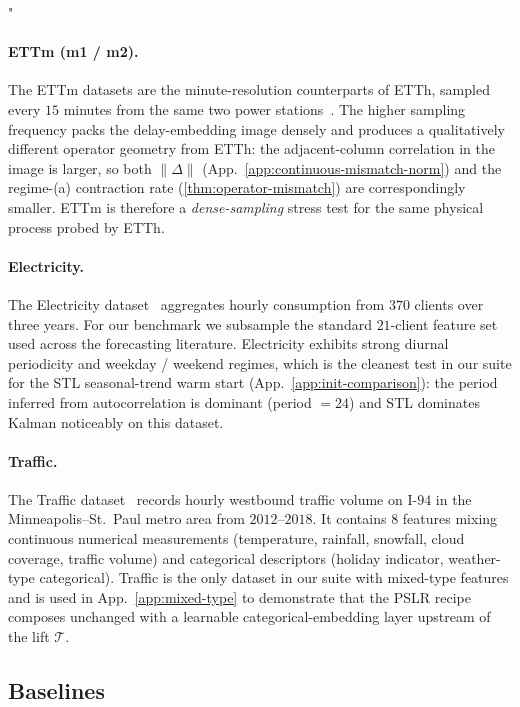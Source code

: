 "\documentclass{article}
\theoremstyle{plain}
\theoremstyle{definition}
\theoremstyle{remark}
\newcommand{\tsimg}{\mathcal{T}}
\begin{document}
\paragraph{ETTm (m1 / m2).}
The ETTm datasets are the minute-resolution counterparts of ETTh, sampled every $15$ minutes from the same two power stations~\citep{zhou2021informer}. The higher sampling frequency packs the delay-embedding image densely and produces a qualitatively different operator geometry from ETTh: the adjacent-column correlation in the image is larger, so both $\|\Delta\|$ (App.~\ref{app:continuous-mismatch-norm}) and the regime-(a) contraction rate (\cref{thm:operator-mismatch}) are correspondingly smaller. ETTm is therefore a \emph{dense-sampling} stress test for the same physical process probed by ETTh.

\paragraph{Electricity.}
The Electricity dataset~\citep{misc_electricityloaddiagrams20112014_321} aggregates hourly consumption from $370$ clients over three years. For our benchmark we subsample the standard $21$-client feature set used across the forecasting literature. Electricity exhibits strong diurnal periodicity and weekday / weekend regimes, which is the cleanest test in our suite for the STL seasonal-trend warm start (App.~\ref{app:init-comparison}): the period inferred from autocorrelation is dominant (period $= 24$) and STL dominates Kalman noticeably on this dataset.

\paragraph{Traffic.}
The Traffic dataset~\citep{metro_interstate_traffic_volume_492} records hourly westbound traffic volume on I-$94$ in the Minneapolis--St.~Paul metro area from $2012$--$2018$. It contains $8$ features mixing continuous numerical measurements (temperature, rainfall, snowfall, cloud coverage, traffic volume) and categorical descriptors (holiday indicator, weather-type categorical). Traffic is the only dataset in our suite with mixed-type features and is used in App.~\ref{app:mixed-type} to demonstrate that the PSLR recipe composes unchanged with a learnable categorical-embedding layer upstream of the lift $\tsimg$.

\subsection{Baselines}
\end{document}
